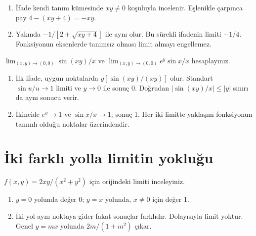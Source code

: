 \begin{tcolorbox}[title={Adım adım çözüm},colback=green!3!white,colframe=green]\begin{enumerate}
\item İfade kendi tanım kümesinde \(xy\ne0\) koşuluyla incelenir. Eşlenikle çarpınca pay \(4-(xy+4)=-xy\).
\item Yakında \(-1/[2+\sqrt{xy+4}]\) ile aynı olur. Bu sürekli ifadenin limiti \(-1/4\). Fonksiyonun eksenlerde tanımsız olması limit almayı engellemez.
\end{enumerate}\end{tcolorbox}
\begin{tcolorbox}[title={Örnek 4.9 | Sinüs içeren limitler},colframe=accent]\(\lim_{(x,y)\to(0,0)}\sin(xy)/x\) ve \(\lim_{(x,y)\to(0,0)}e^y\sin x/x\) hesaplayınız.
\par{}\end{tcolorbox}
\begin{tcolorbox}[title={Adım adım çözüm},colback=green!3!white,colframe=green]\begin{enumerate}
\item İlk ifade, uygun noktalarda \(y[\sin(xy)/(xy)]\) olur. Standart \(\sin u/u\to1\) limiti ve \(y\to0\) ile sonuç 0. Doğrudan \(|\sin(xy)/x|\le|y|\) sınırı da aynı sonucu verir.
\item İkincide \(e^y\to1\) ve \(\sin x/x\to1\); sonuç 1. Her iki limitte yaklaşım fonksiyonun tanımlı olduğu noktalar üzerindendir.
\end{enumerate}\end{tcolorbox}
\section{İki farklı yolla limitin yokluğu}
\begin{tcolorbox}[title={Örnek 4.10 | Doğruya bağlı sonuç},colframe=accent]\(f(x,y)=2xy/(x^2+y^2)\) için orijindeki limiti inceleyiniz.
\par{}\end{tcolorbox}
\begin{tcolorbox}[title={Adım adım çözüm},colback=green!3!white,colframe=green]\begin{enumerate}
\item \(y=0\) yolunda değer 0; \(y=x\) yolunda, \(x\ne0\) için değer 1.
\item İki yol aynı noktaya gider fakat sonuçlar farklıdır. Dolayısıyla limit yoktur. Genel \(y=mx\) yolunda \(2m/(1+m^2)\) çıkar.
\end{enumerate}\end{tcolorbox}
